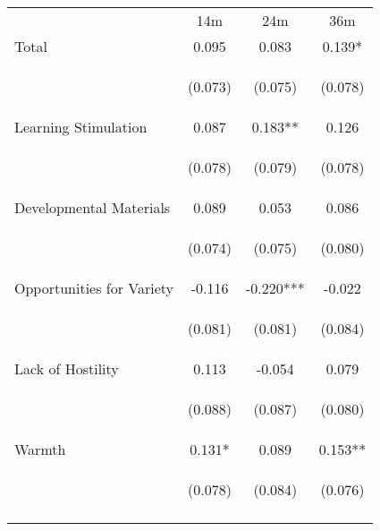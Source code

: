 \begin{tabular}{lccc}
\hline \noalign{\smallskip} & 14m & 24m & 36m\\
\noalign{\smallskip}\hline \noalign{\smallskip}Total & 0.095 & 0.083 & 0.139*\\
 & \begin{footnotesize}(0.073)\end{footnotesize} & \begin{footnotesize}(0.075)\end{footnotesize} & \begin{footnotesize}(0.078)\end{footnotesize}\\
\noalign{\smallskip}Learning Stimulation & 0.087 & 0.183** & 0.126\\
 & \begin{footnotesize}(0.078)\end{footnotesize} & \begin{footnotesize}(0.079)\end{footnotesize} & \begin{footnotesize}(0.078)\end{footnotesize}\\
\noalign{\smallskip}Developmental Materials & 0.089 & 0.053 & 0.086\\
 & \begin{footnotesize}(0.074)\end{footnotesize} & \begin{footnotesize}(0.075)\end{footnotesize} & \begin{footnotesize}(0.080)\end{footnotesize}\\
\noalign{\smallskip}Opportunities for Variety & -0.116 & -0.220*** & -0.022\\
 & \begin{footnotesize}(0.081)\end{footnotesize} & \begin{footnotesize}(0.081)\end{footnotesize} & \begin{footnotesize}(0.084)\end{footnotesize}\\
\noalign{\smallskip}Lack of Hostility & 0.113 & -0.054 & 0.079\\
 & \begin{footnotesize}(0.088)\end{footnotesize} & \begin{footnotesize}(0.087)\end{footnotesize} & \begin{footnotesize}(0.080)\end{footnotesize}\\
\noalign{\smallskip}Warmth & 0.131* & 0.089 & 0.153**\\
 & \begin{footnotesize}(0.078)\end{footnotesize} & \begin{footnotesize}(0.084)\end{footnotesize} & \begin{footnotesize}(0.076)\end{footnotesize}\\
\noalign{\smallskip}\hline\end{tabular}\\
